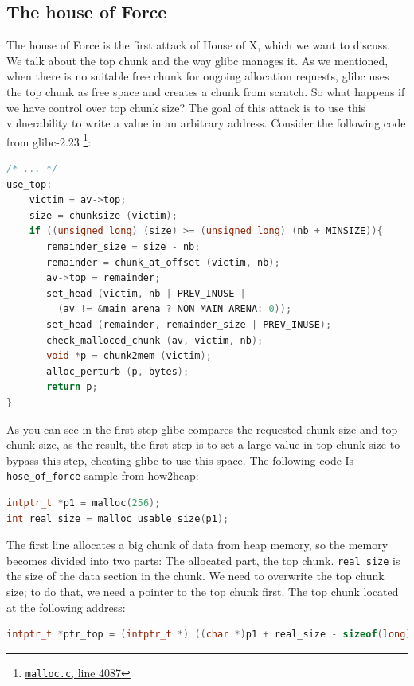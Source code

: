 \documentclass{masterthesis}
\newcommand*\libc{glibc}
\newcommand{\glnote}[1]{\todo[color=yellow!20]{#1}}
\begin{document}
\subsection{The house of Force}
\label{subsect:houseforce}
The house of Force is the first attack of House of X, which we want to discuss.\glnote{It comes after the House of Mind, though\ldots} We talk about the top chunk and the way \libc{} manages it. As we mentioned, when there is no suitable free chunk for ongoing allocation requests, \libc{} uses the top chunk as free space and creates a chunk from scratch. So what happens if we have control over top chunk size? The goal of this attack is to use this vulnerability to write a value in an arbitrary address. Consider the following code from \libc{-2.23} \footnote{\href{https://sourceware.org/git/?p=glibc.git;a=blob;f=malloc/malloc.c;h=f7cd29bc2f93e1082ee77800bd64a4b2a2897055;hb=9ea3686266dca3f004ba874745a4087a89682617\#l4087}{\texttt{malloc.c}, line 4087}}:
\begin{lstlisting}[language=c,frame=tlrb]
 /* ... */
use_top:
	victim = av->top;
	size = chunksize (victim);
	if ((unsigned long) (size) >= (unsigned long) (nb + MINSIZE)){
	   remainder_size = size - nb;
	   remainder = chunk_at_offset (victim, nb);
	   av->top = remainder;
	   set_head (victim, nb | PREV_INUSE |
	     (av != &main_arena ? NON_MAIN_ARENA: 0));
	   set_head (remainder, remainder_size | PREV_INUSE);
	   check_malloced_chunk (av, victim, nb);
	   void *p = chunk2mem (victim);
	   alloc_perturb (p, bytes);
	   return p;
}
\end{lstlisting}
As you can see in the first step \libc{} compares the requested chunk size and top chunk size, as the result, the first step is to set a large value in top chunk size to bypass this step, cheating \libc{} to use this space. The following code Is \lstinline{hose_of_force} sample from how2heap:

\begin{lstlisting}[language=c,frame=tlrb]
intptr_t *p1 = malloc(256);
int real_size = malloc_usable_size(p1);
\end{lstlisting}

The first line allocates a big chunk of data from heap memory, so the memory becomes divided into two parts: The allocated part, the top chunk. \lstinline{real_size} is the size of the data section in the chunk. We need to overwrite the top chunk size; to do that, we need a pointer to the top chunk first. The top chunk located at the following address:

\begin{lstlisting}[language=c,frame=tlrb]
intptr_t *ptr_top = (intptr_t *) ((char *)p1 + real_size - sizeof(long));
\end{lstlisting}
\end{document}
